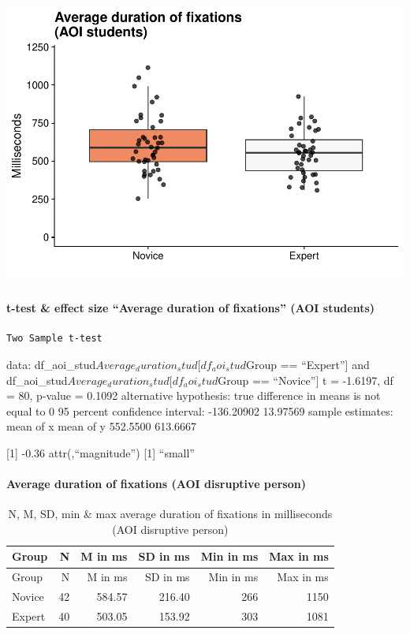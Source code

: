 \documentclass[
]{article}
\begin{document}
\includegraphics{expertise_2024_09_26_no_outlierdetection_MK_files/figure-latex/dur_students-1.pdf}

\paragraph{t-test \& effect size ``Average duration of fixations'' (AOI
students)}\label{t-test-effect-size-average-duration-of-fixations-aoi-students}

\begin{verbatim}
Two Sample t-test
\end{verbatim}

data: df\_aoi\_stud\(Average_duration_stud[df_aoi_stud\)Group ==
``Expert''{]} and
df\_aoi\_stud\(Average_duration_stud[df_aoi_stud\)Group == ``Novice''{]}
t = -1.6197, df = 80, p-value = 0.1092 alternative hypothesis: true
difference in means is not equal to 0 95 percent confidence interval:
-136.20902 13.97569 sample estimates: mean of x mean of y 552.5500
613.6667

{[}1{]} -0.36 attr(,``magnitude'') {[}1{]} ``small''

\paragraph{Average duration of fixations (AOI disruptive
person)}\label{average-duration-of-fixations-aoi-disruptive-person}

\begin{longtable}[]{@{}lrrrrr@{}}
\caption{N, M, SD, min \& max average duration of fixations in
milliseconds (AOI disruptive person)}\tabularnewline
\toprule\noalign{}
Group & N & M in ms & SD in ms & Min in ms & Max in ms \\
\midrule\noalign{}
\endfirsthead
\toprule\noalign{}
Group & N & M in ms & SD in ms & Min in ms & Max in ms \\
\midrule\noalign{}
\endhead
\bottomrule\noalign{}
\endlastfoot
Novice & 42 & 584.57 & 216.40 & 266 & 1150 \\
Expert & 40 & 503.05 & 153.92 & 303 & 1081 \\
\end{longtable}
\end{document}
